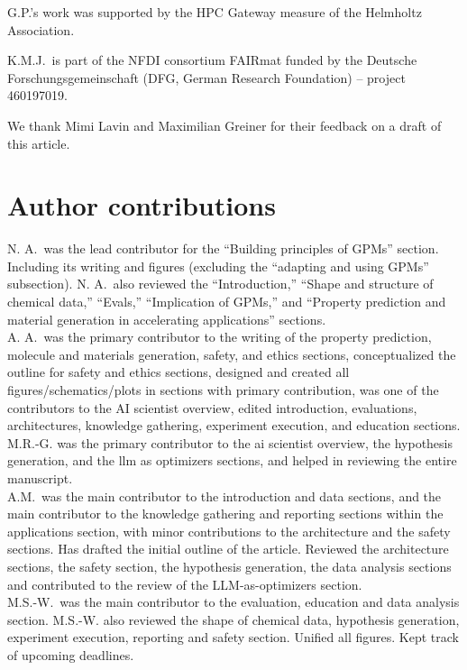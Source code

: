\documentclass[11pt, oneside]{article}
\begin{document}
\noindent G.P.'s work was supported by the HPC Gateway measure of the Helmholtz Association.


\noindent K.M.J.\ is part of the NFDI consortium FAIRmat funded by the Deutsche Forschungsgemeinschaft (DFG, German Research Foundation) – project 460197019.

\noindent We thank Mimi Lavin and Maximilian Greiner for their feedback on a draft of this article.

\section*{Author contributions}
N. A.\ was the lead contributor for the \enquote{Building principles of GPMs} section. Including its writing and figures (excluding the \enquote{adapting and using GPMs} subsection). N. A.\ also reviewed the \enquote{Introduction,} \enquote{Shape and structure of chemical data,} \enquote{Evals,} \enquote{Implication of GPMs,} and \enquote{Property prediction and material generation in accelerating applications} sections. \\

\noindent A. A.\ was the primary contributor to the writing of the property prediction, molecule and materials generation, safety, and ethics sections, conceptualized the outline for safety and ethics sections, designed and created all figures/schematics/plots in sections with primary contribution, was one of the contributors to the AI scientist overview, edited introduction, evaluations, architectures, knowledge gathering, experiment execution, and education sections. \\ 

\noindent M.R.-G. was the primary contributor to the \gls{ai} scientist overview, the hypothesis generation, and the \gls{llm} as optimizers sections, and helped in reviewing the entire manuscript. \\

\noindent A.M.\ was the main contributor to the introduction and data sections, and the main contributor to the knowledge gathering and reporting sections within the applications section, with minor contributions to the architecture and the safety sections. Has drafted the initial outline of the article. Reviewed the architecture sections, the safety section, the hypothesis generation, the data analysis sections and contributed to the review of the LLM-as-optimizers section.\\

\noindent M.S.-W.\ was the main contributor to the evaluation, education and data analysis section. M.S.-W. also reviewed the shape of chemical data, hypothesis generation, experiment execution, reporting and safety section. Unified all figures. Kept track of upcoming deadlines. \\ 
\end{document}
